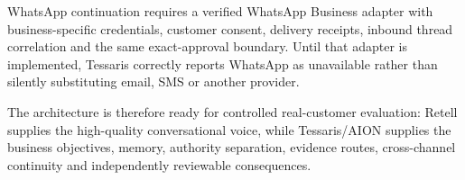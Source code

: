 WhatsApp continuation requires a verified WhatsApp Business adapter with
business-specific credentials, customer consent, delivery receipts, inbound
thread correlation and the same exact-approval boundary.  Until that adapter is
implemented, Tessaris correctly reports WhatsApp as unavailable rather than
silently substituting email, SMS or another provider.

The architecture is therefore ready for controlled real-customer evaluation:
Retell supplies the high-quality conversational voice, while Tessaris/AION
supplies the business objectives, memory, authority separation, evidence routes,
cross-channel continuity and independently reviewable consequences.
